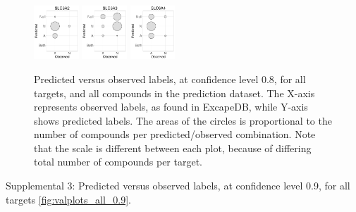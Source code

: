 \documentclass[utf8]{frontiersSCNS} %
\begin{document}
\begin{figure}[h!]
\includegraphics[width=0.15\textwidth]{figures/validation_plots/slc6a2_0p8_valplot.pdf}
\includegraphics[width=0.15\textwidth]{figures/validation_plots/slc6a3_0p8_valplot.pdf}
\vspace*{10pt} %
\includegraphics[width=0.15\textwidth]{figures/validation_plots/slc6a4_0p8_valplot.pdf}

    \caption{Predicted versus observed labels, at confidence level 0.8,
    for all targets, and all compounds in the prediction dataset.
    The X-axis represents observed labels, as found in ExcapeDB, while Y-axis
    shows predicted labels. The areas of the circles is proportional to the
    number of compounds per predicted/observed combination. Note that the scale
    is different between each plot, because of differing total number of
    compounds per target.}
    \label{fig:valplots_all_0.8}
\end{figure}

Supplemental 3: Predicted versus observed labels, at confidence level 0.9,
    for all targets \ref{fig:valplots_all_0.9}.
\end{document}
